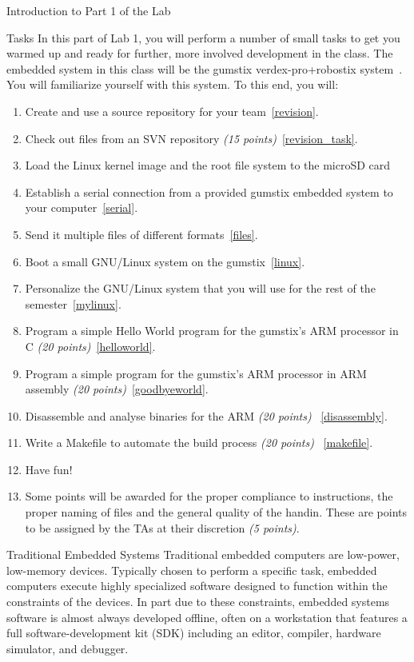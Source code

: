 \documentclass{article}
\begin{document}
\begin{section}{Introduction to Part 1 of the Lab}
		\begin{subsection}{Tasks} In this part of Lab 1, you
		will perform a number of small tasks to get you warmed
		up and ready for further, more involved development in
		the class.  The embedded system in this class will be
		the gumstix verdex-pro+robostix system~\cite{gumstix:wiki}.  
		You will familiarize
		yourself with this system.  To this end, you will:
		\begin{enumerate} \item Create and use a source
		repository for your team~\ref{revision}.  \item Check
		out files from an SVN repository \emph{(15
		points)}~\ref{revision_task}.  
		\item Load the Linux kernel image and the root file system 
		to the microSD card \item Establish a
		serial connection from a provided gumstix embedded
		system to your computer~\ref{serial}.  \item Send it
		multiple files of different formats~\ref{files}.
		\item Boot a small GNU/Linux system on the
		gumstix~\ref{linux}.  \item Personalize the GNU/Linux
		system that you will use for the rest of the
		semester~\ref{mylinux}.  \item Program a simple Hello
		World program for the gumstix's ARM processor in C
		\emph{(20 points)}~\ref{helloworld}.  \item Program a
		simple program for the gumstix's ARM processor in ARM
		assembly \emph{(20 points)}~\ref{goodbyeworld}.  \item
		Disassemble and analyse binaries for the ARM \emph{(20
		points)}~ \ref{disassembly}.  \item Write a Makefile
		to automate the build process \emph{(20 points)}~
		\ref{makefile}.  \item Have fun!  \item Some points
		will be awarded for the proper compliance to instructions,
		the proper naming of files and the general quality of the handin.
		These are points to be assigned by the TAs at their discretion \emph{(5
		points)}.  \end{enumerate} \end{subsection}

		\begin{subsection}{Traditional Embedded Systems}
		Traditional embedded computers are low-power, low-memory devices.  Typically chosen to perform a
		specific task, embedded computers execute highly
		specialized software designed to function within the
		constraints of the devices.  In part due to these
		constraints, embedded systems software is almost
		always developed offline, often on a workstation that
		features a full software-development kit (SDK)
		including an editor, compiler, hardware simulator, and
		debugger.  \end{subsection}


\end{section}
\end{document}
